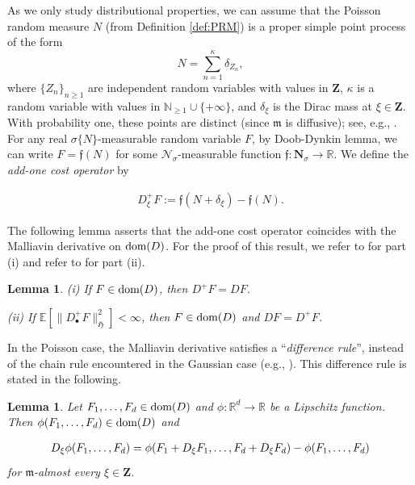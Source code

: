 \documentclass[letterpaper, 11pt,  reqno]{amsart}
\newtheorem{lemma}[theorem]{Lemma}
\newcommand{\noi}{\noindent}
\newcommand{\R}{\mathbb{R}}
\newcommand{\bul}{\bullet}
\newcommand{\bR}{\mathbb{R}}
\newcommand{\E}{\mathbb{E}}
\newcommand{\ff}{\mathfrak{f}}
\newcommand{\bfN}{\mathbf{N}}
\newcommand{\scrN}{\mathscr{N}}
\newcommand{\dl}{\delta}
\newcommand{\s}{\sigma}
\newcommand{\N}{\mathbb{N}}
\newcommand{\fm}{\mathfrak{m}}
\newcommand{\fH}{\mathfrak{H}}
\newcommand{\dom}{\textup{dom}}
\numberwithin{equation}{section}
\numberwithin{theorem}{section}
\begin{document}
As we only study distributional properties,
we can assume that the Poisson
random measure $N$ (from Definition \ref{def:PRM}) is a 
proper simple point process of the form
\[
N = \sum_{n=1}^\kappa \dl_{Z_n},
\]
where $\{Z_n\}_{n\geq 1}$ are independent random variables with values in $ \mathbf{Z}$,  
$\kappa$ is a
random variable with values in $\N_{\geq 1}\cup\{+\infty\}$,
and $\dl_\xi$ is the Dirac mass at $\xi \in  \mathbf{Z}$. With probability one, 
these points are distinct (since $\fm$ 
is diffusive); see, e.g.,  \cite[Corollary 3.7]{LP18}.
%
%
%
For any real $\s\{N\}$-measurable random variable $F$, by Doob-Dynkin lemma, 
we can write $F = \ff(N)$ for some $\scrN_\s$-measurable function $\ff: \bfN_\s\to \R$. We define 
the {\em add-one cost operator} by

\noi
\begin{align}\label{addcost}
D^+_\xi F :=  \ff(N+\dl_\xi) - \ff(N).
\end{align}
 
The following lemma asserts  that the add-one cost operator coincides 
with the Malliavin derivative on $\dom(D)$.
For the proof of this result, we refer to \cite[Theorem 3]{Last16} for part (i)
and refer to \cite[Lemma 3.1]{PT13} for part (ii).
 
\begin{lemma}
\label{rem_BZ-ii}
{\rm (i)}  If $F\in\dom(D)$, then $D^+F = DF$.

\smallskip
\noi
{\rm (ii)} If $\E [\| D^+_\bul F\|_{\fH}^2 ] < \infty$, then 
$F\in\dom (D)$ and $DF = D^+F$.
\end{lemma}

In the Poisson case, the Malliavin derivative satisfies a ``{\it difference rule}'', instead of the chain rule encountered in the Gaussian case (e.g., \cite[Proposition 2.3.8]{blue}). 
This difference rule is stated in the following.


\begin{lemma} \label{chain}
Let $F_1,\ldots,F_d \in \dom(D)$ and $\phi:\bR^d \to \bR$ be a Lipschitz  function.
Then $\phi(F_1,\ldots,F_d) \in \dom(D)$ and

\noi
\begin{align} \notag %
D_\xi \phi(F_1,\ldots,F_d)=\phi(F_1+D_\xi F_1,\ldots, F_d+D_\xi F_d)-\phi(F_1,\ldots,F_d)
\end{align}
for $\fm$-almost every $\xi\in\mathbf{Z}$.

\end{lemma}
\end{document}
